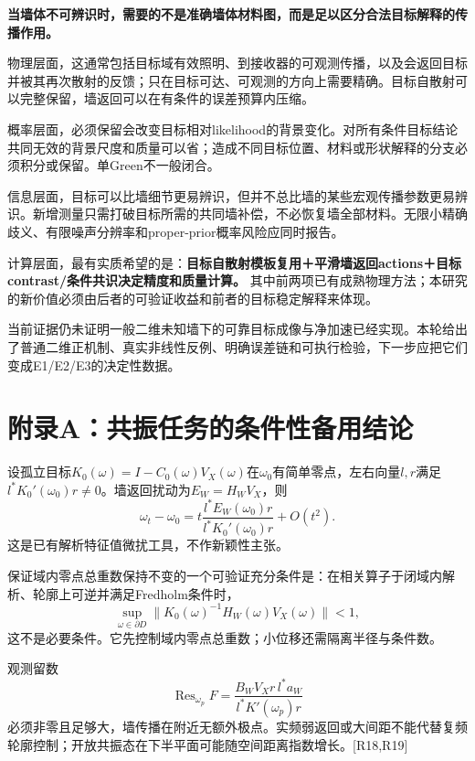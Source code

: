 \documentclass[
  10pt,
  a4paper,
]{article}
\begin{document}
\textbf{当墙体不可辨识时，需要的不是准确墙体材料图，而是足以区分合法目标解释的传播作用。}

物理层面，这通常包括目标域有效照明、到接收器的可观测传播，以及会返回目标并被其再次散射的反馈；只在目标可达、可观测的方向上需要精确。目标自散射可以完整保留，墙返回可以在有条件的误差预算内压缩。

概率层面，必须保留会改变目标相对likelihood的背景变化。对所有条件目标结论共同无效的背景尺度和质量可以省；造成不同目标位置、材料或形状解释的分支必须积分或保留。单Green不一般闭合。

信息层面，目标可以比墙细节更易辨识，但并不总比墙的某些宏观传播参数更易辨识。新增测量只需打破目标所需的共同墙补偿，不必恢复墙全部材料。无限小精确歧义、有限噪声分辨率和proper-prior概率风险应同时报告。

计算层面，最有实质希望的是：\textbf{目标自散射模板复用＋平滑墙返回actions＋目标contrast/条件共识决定精度和质量计算。}
其中前两项已有成熟物理方法；本研究的新价值必须由后者的可验证收益和前者的目标稳定解释来体现。

当前证据仍未证明一般二维未知墙下的可靠目标成像与净加速已经实现。本轮给出了普通二维正机制、真实非线性反例、明确误差链和可执行检验，下一步应把它们变成E1/E2/E3的决定性数据。

\hypertarget{ux9644ux5f55aux5171ux632fux4efbux52a1ux7684ux6761ux4ef6ux6027ux5907ux7528ux7ed3ux8bba}{%
\section{附录A：共振任务的条件性备用结论}\label{ux9644ux5f55aux5171ux632fux4efbux52a1ux7684ux6761ux4ef6ux6027ux5907ux7528ux7ed3ux8bba}}

设孤立目标\(K_0(\omega)=I-C_0(\omega)V_X(\omega)\)在\(\omega_0\)有简单零点，左右向量\(l,r\)满足\(l^*K_0'(\omega_0)r\ne0\)。墙返回扰动为\(E_W=H_WV_X\)，则
\[
\omega_t-\omega_0
=t\frac{l^*E_W(\omega_0)r}{l^*K_0'(\omega_0)r}+O(t^2).
\] 这是已有解析特征值微扰工具，不作新颖性主张。

保证域内零点总重数保持不变的一个可验证充分条件是：在相关算子于闭域内解析、轮廓上可逆并满足Fredholm条件时，
\[
\sup_{\omega\in\partial D}
\|K_0(\omega)^{-1}H_W(\omega)V_X(\omega)\|<1,
\] 这不是必要条件。它先控制域内零点总重数；小位移还需隔离半径与条件数。

观测留数 \[
\operatorname{Res}_{\omega_p}F
=
\frac{B_WV_X r\,l^*a_W}{l^*K'(\omega_p)r}
\]
必须非零且足够大，墙传播在附近无额外极点。实频弱返回或大间距不能代替复频轮廓控制；开放共振态在下半平面可能随空间距离指数增长。{[}R18,R19{]}
\end{document}
